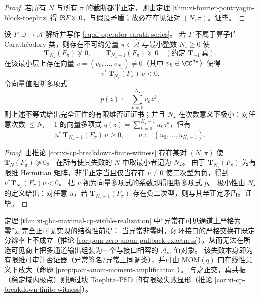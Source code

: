 \begin{proof}
若所有 \(N\) 与所有 \(\pi\) 的截断都半正定，则由定理 \ref{thm:xi-fourier-pontryagin-block-toeplitz} 得 \(\Re F\succeq 0\)，与假设矛盾；故必存在见证对 \((N,\pi)\)。证毕。
\end{proof}

\begin{proposition}\label{prop:xi-toeplitz-first-failure-minimal-blocking-polynomial}
设 \(F:\mathbb{D}\to\mathcal{A}\) 解析并写作 \eqref{eq:xi-operator-carath-series}。
若 \(F\) 不属于算子值 Carath\'eodory 类，则存在不可约分量 \(\pi\in\widehat{\mathcal{A}}\) 与最小整数 \(N_\star\ge 0\) 使
\[
\mathbf{T}_{N_\star}(F_\pi)\nsucceq 0,
\qquad
\mathbf{T}_{N_\star-1}(F_\pi)\succeq 0
\quad(\text{约定 }\mathbf{T}_{-1}\ \text{真}).
\]
在该最小层上存在向量 \(v=(v_0,\dots,v_{N_\star})\neq 0\)（其中 \(v_k\in\CC^{d_\pi}\)）使得
\[
v^\ast\,\mathbf{T}_{N_\star}(F_\pi)\,v<0.
\]
令向量值阻断多项式
\[
p(z):=\sum_{k=0}^{N_\star} v_k z^k,
\]
则上述不等式给出完全正性的有限维否证证书；并且 \(N_\star\) 在次数意义下极小：对任意次数 \(\le N_\star-1\) 的向量多项式 \(q(z)=\sum_{k=0}^{N_\star-1}u_k z^k\)，恒有
\[
u^\ast\,\mathbf{T}_{N_\star-1}(F_\pi)\,u\ge 0,
\qquad
u:=(u_0,\dots,u_{N_\star-1}).
\]
\end{proposition}

\begin{proof}
由推论 \ref{cor:xi-cp-breakdown-finite-witness} 存在某对 \((N,\pi)\) 使 \(\mathbf{T}_N(F_\pi)\nsucceq 0\)。
在所有使其失败的 \(N\) 中取最小者记为 \(N_\star\)。
由于 \(\mathbf{T}_{N_\star}(F_\pi)\) 为有限维 Hermitian 矩阵，非半正定当且仅当存在 \(v\neq 0\) 使二次型为负，得到 \(v^\ast\mathbf{T}_{N_\star}(F_\pi)v<0\)。
把 \(v\) 视为向量多项式的系数即得阻断多项式 \(p\)。
极小性由 \(N_\star\) 的定义给出：对任意 \(u\)，若 \(\mathbf{T}_{N_\star-1}(F_\pi)\) 存在负二次型，则与其半正定矛盾。证毕。
\end{proof}

\begin{remark}\label{rem:xi-anom-as-cp-visible-obstruction}
定理 \ref{thm:xi-gbc-maximal-cp-visible-realization} 中“异常在可见通道上严格为零”是完全正可见实现的结构性前提：
当异常非零时，闭环接口的严格交换在既定分辨率上不成立（推论 \ref{cor:pom-zero-anom-pullback-exactness}），从而无法在所选可见商上把多通道输出组装为一个与接口相容的 \(\mathcal{A}_m\)-值对象。
该失败本身即为有限维可审计否证器（异常签名/异常上同调类），并可由 MOM\((q)\) 门在线性意义下放大（命题 \ref{prop:pom-anom-moment-amplification}）。
与之正交，真共振（稳定域内极点）则通过块 Toeplitz--PSD 的有限级失败显形（推论 \ref{cor:xi-cp-breakdown-finite-witness}）。
\end{remark}

\endinput
